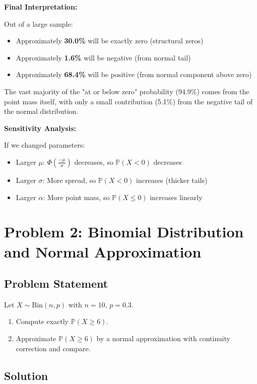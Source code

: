 \documentclass[12pt]{article}
\begin{document}
\begin{explanation}
\textbf{Final Interpretation:}

Out of a large sample:
\begin{itemize}
    \item Approximately \textbf{30.0\%} will be exactly zero (structural zeros)
    \item Approximately \textbf{1.6\%} will be negative (from normal tail)
    \item Approximately \textbf{68.4\%} will be positive (from normal component above zero)
\end{itemize}

The vast majority of the "at or below zero" probability (94.9\%) comes from the point mass itself, with only a small contribution (5.1\%) from the negative tail of the normal distribution.

\textbf{Sensitivity Analysis:}

If we changed parameters:
\begin{itemize}
    \item Larger \(\mu\): \(\Phi\left(\frac{-\mu}{\sigma}\right)\) decreases, so \(\mathbb{P}(X < 0)\) decreases
    \item Larger \(\sigma\): More spread, so \(\mathbb{P}(X < 0)\) increases (thicker tails)
    \item Larger \(\alpha\): More point mass, so \(\mathbb{P}(X \leq 0)\) increases linearly
\end{itemize}
\end{explanation}

\newpage

\section{Problem 2: Binomial Distribution and Normal Approximation}

\subsection{Problem Statement}
Let \( X \sim \text{Bin}(n, p) \) with \( n = 10, \, p = 0.3 \).
\begin{enumerate}
\item Compute exactly \(\mathbb{P}(X \geq 6)\).
\item Approximate \(\mathbb{P}(X \geq 6)\) by a normal approximation with continuity correction and compare.
\end{enumerate}

\subsection{Solution}
\end{document}
